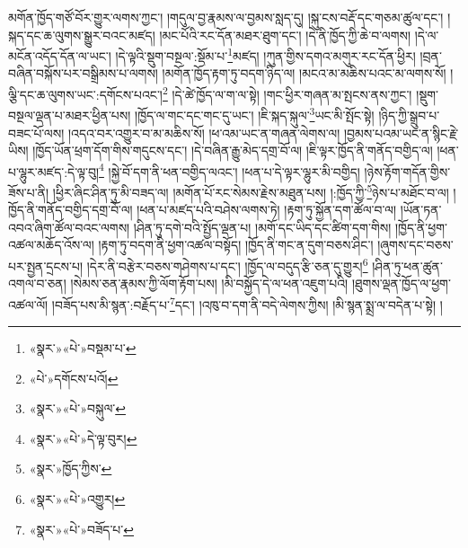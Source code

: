 མགོན་ཁྱོད་གཙོ་བོར་གྱུར་ལགས་ཀྱང་། །གདུལ་བྱ་རྣམས་ལ་བྱམས་སླད་དུ། །སྐུ་ངས་བརྡོ་དང་གཅམ་ཚུལ་དང་། །སྐད་དང་ཆ་ལུགས་སྒྱུར་བའང་མཛད། །མང་པོའི་རང་དོན་མཐར་ཐུག་དང་། །དེ་ནི་ཁྱོད་ཀྱི་ཆེ་བ་ལགས། །དེ་ལ་མངོན་འདོད་དོན་ལ་ཡང་། །དེ་ལྟའི་སྡུག་བསྔལ་:སྡོམ་པ་\footnote{«སྣར་»«པེ་»བསྡམ་པ་}མཛད། །ཀུན་གྱིས་དགའ་མགུར་རང་དོན་ཕྱིར། །བྲན་བཞིན་བསྐོས་པར་བསྒྲིམས་པ་ལགས། །མགོན་ཁྱོད་རྟག་ཏུ་བདག་ཉིད་ལ། །མངའ་མ་མཆིས་པའང་མ་ལགས་སོ། །ལྕི་དང་ཆ་ལུགས་ཡང་:དགོངས་པའང་།\footnote{«པེ་»དགོངས་པའོ།} །དེ་ཚེ་ཁྱོད་ལ་ག་ལ་སྟེ། །གང་ཕྱིར་གཞན་མ་སྤངས་ནས་ཀྱང་། །སྡུག་བསྔལ་ལྡན་པ་མཐར་ཕྱིན་པས། །ཁྱོད་ལ་གང་དང་གང་དུ་ཡང་། །ཇི་སྐད་སྐུལ་\footnote{«སྣར་»«པེ་»བསྐུལ་}ཡང་མི་སྤོང་སྟེ། །ཉིད་ཀྱི་སྒྲུབ་པ་བཟང་པོ་ལས། །འདའ་བར་འགྱུར་བ་མ་མཆིས་སོ། །ཕ་འམ་ཡང་ན་གཞན་ལེགས་ལ། །བྱམས་པའམ་ཡང་ན་སྙིང་རྗེ་ཡིས། །ཁྱོད་ཡོན་ཕྲག་དོག་གིས་གདུངས་དང་། །དེ་བཞིན་རྒྱུ་མེད་དགྲ་བོ་ལ། །ཇི་ལྟར་ཁྱོད་ནི་གནོད་བགྱིད་ལ། །ཕན་པ་ལྷུར་མཛད་:དེ་ལྟ་བུ།\footnote{«སྣར་»«པེ་»དེ་ལྟ་བུར།} །སྐྱེ་བོ་དག་ནི་ཕན་བགྱིད་ལའང་། །ཕན་པ་དེ་ལྟར་ལྷུར་མི་བགྱིད། །ཉེས་རྟོག་གདོན་གྱིས་ཟོས་པ་ནི། །ཕྱིར་ཞིང་ཤིན་ཏུ་མི་བཟད་ལ། །མགོན་པོ་རང་སེམས་རྗེས་མཐུན་པས། །:ཁྱོད་ཀྱི་\footnote{«སྣར་»ཁྱོད་ཀྱིས་}ཉེས་པ་མཐོང་བ་ལ། །ཁྱོད་ནི་གནོད་བགྱིད་དགྲ་བོ་ལ། །ཕན་པ་མཛད་པའི་བཤེས་ལགས་ཏེ། །རྟག་ཏུ་སྐྱོན་དག་ཚོལ་བ་ལ། །ཡོན་ཏན་འབའ་ཞིག་ཚོལ་བའང་ལགས། །ཤིན་ཏུ་དགེ་བའི་སྤྱོད་ལྡན་པ། །མགོ་དང་ཡིད་དང་ཚིག་དག་གིས། །ཁྱོད་ནི་ཕྱག་འཚལ་མཆོད་འོས་ལ། །རྟག་ཏུ་བདག་ནི་ཕྱག་འཚལ་བསྟོད། །ཁྱོད་ནི་གང་ན་དུག་བཅས་ཤིང་། །ཞུགས་དང་བཅས་པར་སྤྱན་དྲངས་པ། །དེར་ནི་བརྩེར་བཅས་གཤེགས་པ་དང་། །ཁྱོད་ལ་བདུད་རྩི་ཅན་དུ་གྱུར།\footnote{«སྣར་»«པེ་»འགྱུར།} །ཤིན་ཏུ་ཕན་ཚུན་འགལ་བ་ཅན། །སེམས་ཅན་རྣམས་ཀྱི་ལོག་རྟོག་པས། །མི་བསྐྱོད་དེ་ལ་ཕན་འཇུག་པའི། །ཐུགས་ལྡན་ཁྱོད་ལ་ཕྱག་འཚལ་ལོ། །བཟོད་པས་མི་སྙན་:བརྗོད་པ་\footnote{«སྣར་»«པེ་»བཟོད་པ་}དང་། །འཁུ་བ་དག་ནི་བདེ་ལེགས་ཀྱིས། །མི་སྙན་སྨྲ་ལ་བདེན་པ་སྟེ། །
